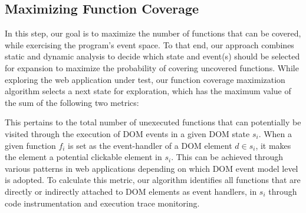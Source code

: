 \subsection{Maximizing Function Coverage} 
\label{Sec:funcCovg}

%
In this step, our goal is to maximize the number of functions that can be covered, while exercising the program's event space. 
To that end, our approach combines static and dynamic analysis to decide which state and event(s) should be selected for expansion to maximize the probability of covering uncovered \javascript functions. While exploring the web application under test, our function coverage maximization algorithm 
selects a next state for exploration, which has the maximum value of the sum of the following two metrics:

  This pertains to 
the total number of unexecuted functions that can potentially be visited through the execution of DOM events in a given DOM state $s_i$. When a given function $f_i$ is set as the event-handler of a DOM element $d \in s_i$, it makes the element a potential clickable element in $s_i$. This can be achieved through various patterns in web applications depending on which DOM event model level is adopted. To calculate this metric, our algorithm identifies all \javascript functions that are directly or indirectly attached to DOM elements as event handlers, in $s_i$ through code instrumentation and execution trace monitoring.  
%


